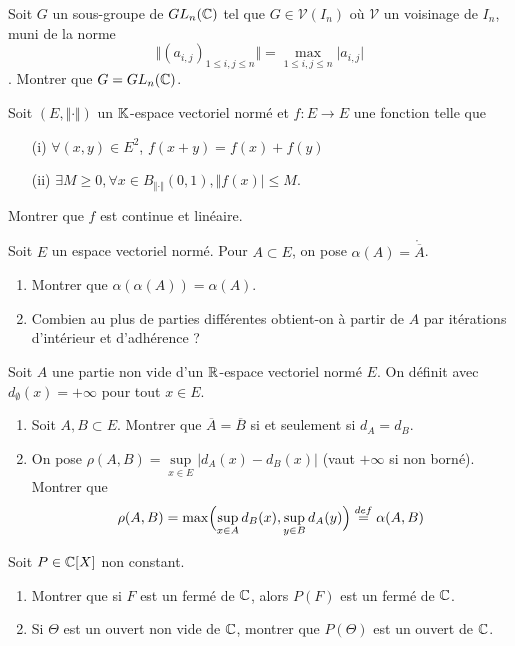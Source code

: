 \documentclass[12pt]{article}
\begin{document}
\begin{exercise}
	Soit $G$ un sous-groupe de $GL_{n}(\mathbb{C})$ tel que $G\in\mathcal{V}(I_{n})$ où $\mathcal{V}$ un voisinage de $I_{n}$, muni de la norme 
	$$\Vert (a_{i,j})_{1\leqslant i,j\leqslant n}\Vert=\max\limits_{1\leqslant i,j\leqslant n}\vert a_{i,j}\vert$$. Montrer que $G=GL_{n}(\mathbb{C})$.
\end{exercise}

\begin{exercise}
	Soit $(E,\Vert\cdot\Vert)$ un $\mathbb{K}$-espace vectoriel normé et $f:E\to E$ une fonction telle que 
	\begin{enumerate}
		\item [(i)] $\forall(x,y)\in E^{2}$, $f(x+y)=f(x)+f(y)$
		\item [(ii)] $\exists M\geqslant0,\forall x\in B_{\Vert\cdot\Vert}(0,1),\Vert f(x)\vert\leqslant M$.
	\end{enumerate}
	Montrer que $f$ est continue et linéaire.
\end{exercise}

\begin{exercise}
	Soit $E$ un espace vectoriel normé. Pour $A\subset E$, on pose $\alpha(A)=\mathring{\overline{A}}$.
	\begin{enumerate}
		\item Montrer que $\alpha(\alpha(A))=\alpha(A)$.
		\item Combien au plus de parties différentes obtient-on à partir de $A$ par itérations d'intérieur et d'adhérence ?
	\end{enumerate}
\end{exercise}

\begin{exercise}
	Soit $A$ une partie non vide d'un $\mathbb{R}$-espace vectoriel normé $E$. On définit  avec $d_{\emptyset}(x)=+\infty$ pour tout $x\in E$.
	\begin{enumerate}
		\item Soit $A,B\subset E$. Montrer que $\overline{A}=\overline{B}$ si et seulement si $d_{A}=d_{B}$.
		\item On pose $\rho(A,B)=\sup\limits_{x\in E}\vert d_{A}(x)-d_{B}(x)\vert$ (vaut $+\infty$ si non borné). Montrer que 
		$$\rho(A,B)=\max\Bigl(\sup\limits_{x\in A}d_{B}(x),\sup\limits_{y\in B}d_{A}(y)\Bigr)\overset{def}{=}\alpha(A,B)$$
	\end{enumerate}
\end{exercise}

\begin{exercise}
	Soit $P\in\mathbb{C}[X]$ non constant.
	\begin{enumerate}
		\item Montrer que si $F$ est un fermé de $\mathbb{C}$, alors $P(F)$ est un fermé de $\mathbb{C}$.
		\item Si $\Theta$ est un ouvert non vide de $\mathbb{C}$, montrer que $P(\Theta)$ est un ouvert de $\mathbb{C}$.
	\end{enumerate}
\end{exercise}
\end{document}
